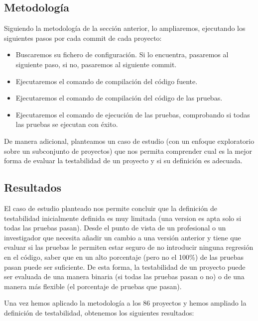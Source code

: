\subsection{Metodología}

Siguiendo la metodología de la sección anterior, lo ampliaremos, ejecutando los siguientes pasos por cada commit de cada proyecto:

\begin{itemize}
    \item Buscaremos su fichero de configuración. Si lo encuentra, pasaremos al siguiente paso, si no, pasaremos al siguiente commit.
    \item Ejecutaremos el comando de compilación del código fuente.
    \item Ejecutaremos el comando de compilación del código de las pruebas.
    \item Ejecutaremos el comando de ejecución de las pruebas, comprobando si todas las pruebas se ejecutan con éxito.
\end{itemize}

De manera adicional, planteamos un caso de estudio (con un enfoque exploratorio sobre un subconjunto de proyectos) que nos permita comprender cual es la mejor forma de evaluar la testabilidad de un proyecto y si su definición es adecuada.

\subsection{Resultados}

El caso de estudio planteado nos permite concluir que la definición de testabilidad inicialmente definida es muy limitada (una version es apta solo si todas las pruebas pasan). 
Desde el punto de vista de un profesional o un investigador que necesita añadir un cambio a una versión anterior y tiene que evaluar si las pruebas le permiten estar seguro de no introducir ninguna regresión en el código, saber que en un alto porcentaje (pero no el 100\%) de las pruebas pasan puede ser suficiente.
De esta forma, la testabilidad de un proyecto puede ser evaluada de una manera binaria (si todas las pruebas pasan o no) o de una manera más flexible (el porcentaje de pruebas que pasan).

Una vez hemos aplicado la metodología a los 86 proyectos y hemos ampliado la definición de testabilidad, obtenemos los siguientes resultados:

